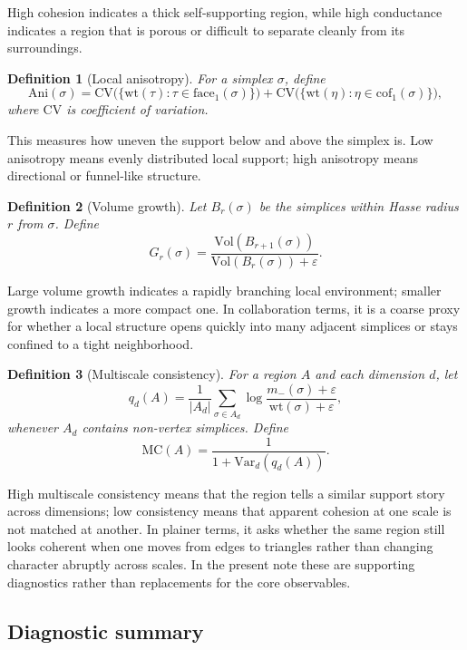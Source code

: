 \documentclass[11pt]{article}
\newtheorem{definition}{Definition}[section]
\newcommand{\eps}{\varepsilon}
\newcommand{\wt}{\mathrm{wt}}
\newcommand{\cof}{\mathrm{cof}}
\newcommand{\face}{\mathrm{face}}
\begin{document}
High cohesion indicates a thick self-supporting region, while high conductance indicates a region that is porous or difficult to separate cleanly from its surroundings.

\begin{definition}[Local anisotropy]
For a simplex $\sigma$, define
\[
\mathrm{Ani}(\sigma)=\mathrm{CV}\bigl(\{\wt(\tau):\tau\in \face_1(\sigma)\}\bigr)+
\mathrm{CV}\bigl(\{\wt(\eta):\eta\in \cof_1(\sigma)\}\bigr),
\]
where $\mathrm{CV}$ is coefficient of variation.
\end{definition}

This measures how uneven the support below and above the simplex is. Low anisotropy means evenly distributed local support; high anisotropy means directional or funnel-like structure.

\begin{definition}[Volume growth]
Let $B_r(\sigma)$ be the simplices within Hasse radius $r$ from $\sigma$. Define
\[
G_r(\sigma)=\frac{\mathrm{Vol}(B_{r+1}(\sigma))}{\mathrm{Vol}(B_r(\sigma))+\eps}.
\]
\end{definition}

Large volume growth indicates a rapidly branching local environment; smaller growth indicates a more compact one. In collaboration terms, it is a coarse proxy for whether a local structure opens quickly into many adjacent simplices or stays confined to a tight neighborhood.

\begin{definition}[Multiscale consistency]
For a region $A$ and each dimension $d$, let
\[
q_d(A)=\frac{1}{|A_d|}\sum_{\sigma\in A_d}\log\frac{m_-(\sigma)+\eps}{\wt(\sigma)+\eps},
\]
whenever $A_d$ contains non-vertex simplices. Define
\[
\mathrm{MC}(A)=\frac{1}{1+\mathrm{Var}_d(q_d(A))}.
\]
\end{definition}

High multiscale consistency means that the region tells a similar support story across dimensions; low consistency means that apparent cohesion at one scale is not matched at another. In plainer terms, it asks whether the same region still looks coherent when one moves from edges to triangles rather than changing character abruptly across scales. In the present note these are supporting diagnostics rather than replacements for the core observables.

\subsection{Diagnostic summary}
\end{document}
